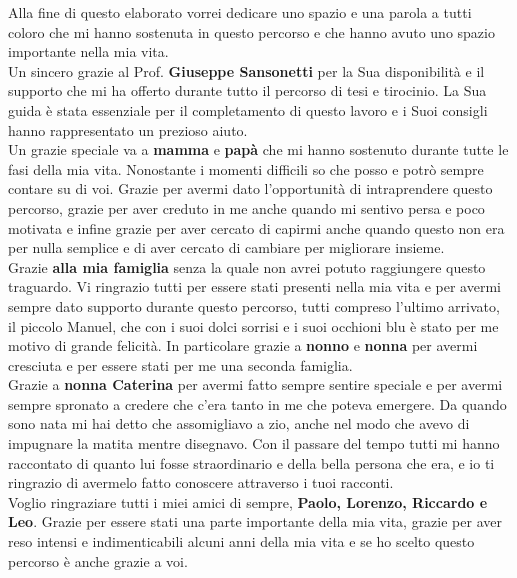 Alla fine di questo elaborato vorrei dedicare uno spazio e una parola a tutti coloro che mi hanno sostenuta in questo percorso e che hanno avuto uno spazio importante nella mia vita.\\


\noindent Un sincero grazie al Prof. \textbf{Giuseppe Sansonetti} per la Sua disponibilità e il supporto che mi ha offerto durante tutto il percorso di tesi e tirocinio. La Sua guida è stata essenziale per il completamento di questo lavoro e i Suoi consigli hanno rappresentato un prezioso aiuto.\\


\noindent Un grazie speciale va a \textbf{mamma} e \textbf{papà} che mi hanno sostenuto durante tutte le fasi della mia vita. Nonostante i momenti difficili so che posso e potrò sempre contare su di voi. Grazie per avermi dato l'opportunità di intraprendere questo percorso, grazie per aver creduto in me anche quando mi sentivo persa e poco motivata e infine grazie per aver cercato di capirmi anche quando questo non era per nulla semplice e di aver cercato di cambiare per migliorare insieme.\\


\noindent Grazie \textbf{alla mia famiglia} senza la quale non avrei potuto raggiungere questo traguardo. Vi ringrazio tutti per essere stati presenti nella mia vita e per avermi sempre dato supporto durante questo percorso, tutti compreso l'ultimo arrivato, il piccolo Manuel, che con i suoi dolci sorrisi e i suoi occhioni blu è stato per me motivo di grande felicità.
In particolare grazie a \textbf{nonno} e \textbf{nonna} per avermi cresciuta e per essere stati per me una seconda famiglia.\\

\noindent Grazie a \textbf{nonna Caterina} per avermi fatto sempre sentire speciale e per avermi sempre spronato a credere che c'era tanto in me che poteva emergere. Da quando sono nata mi hai detto che assomigliavo a zio, anche nel modo che avevo di impugnare la matita mentre disegnavo. Con il passare del tempo tutti mi hanno raccontato di quanto lui fosse straordinario e della bella persona che era, e io ti ringrazio di avermelo fatto conoscere attraverso i tuoi racconti.\\


\noindent Voglio ringraziare tutti i miei amici di sempre, \textbf{Paolo, Lorenzo, Riccardo e Leo}. Grazie per essere stati una parte importante della mia vita, grazie per aver reso intensi e indimenticabili alcuni anni della mia vita e se ho scelto questo percorso è anche grazie a voi.  

